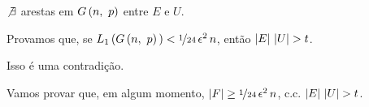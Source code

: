 \begin{fato}
  \normalfont
  $\not\exists$ arestas  em $G\left(n,\ p\vphantom{1j}\right)$ entre $E$ e $U$.
\end{fato}

Provamos que, se $L_1\left(G\left(n,\ p\vphantom{1j}\right)\vphantom{1j}\right)<\nicefrac{1}{24}\,\epsilon^2\,n$, então $\left|E\vphantom{1j}\right|\,\left|U\vphantom{1j}\right|>t$.

Isso é uma contradição.

Vamos provar que, em algum momento, $\left|F\vphantom{1j}\right|\geq\nicefrac{1}{24}\,\epsilon^2\,n$, c.c. $\left|E\vphantom{1j}\right|\,\left|U\vphantom{1j}\right|>t$.


